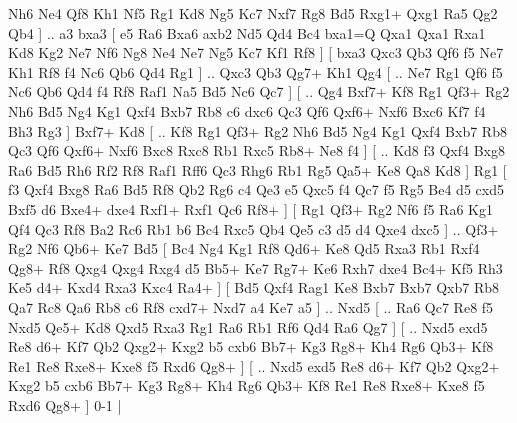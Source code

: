 Nh6  Ne4 Qf8  Kh1 Nf5  Rg1 Kd8  Ng5 Kc7  Nxf7 Rg8  Bd5 Rxg1+  Qxg1 Ra5  Qg2 Qb4   ] .. a3    bxa3 [  e5 Ra6  Bxa6 axb2  Nd5 Qd4  Bc4 bxa1=Q  Qxa1 Qxa1  Rxa1 Kd8  Kg2 Ne7  Nf6 Ng8  Ne4 Ne7  Ng5 Kc7  Kf1 Rf8   ]  [  bxa3 Qxc3  Qb3 Qf6  f5 Ne7  Kh1 Rf8  f4 Nc6  Qb6 Qd4  Rg1   ] .. Qxc3    Qb3   Qg7+    Kh1  Qg4 [ .. Ne7  Rg1 Qf6  f5 Nc6  Qb6 Qd4  f4 Rf8  Raf1 Na5  Bd5 Nc6  Qc7   ]  [ .. Qg4  Bxf7+ Kf8  Rg1 Qf3+  Rg2 Nh6  Bd5 Ng4  Kg1 Qxf4  Bxb7 Rb8  c6 dxc6  Qc3 Qf6  Qxf6+ Nxf6  Bxc6 Kf7  f4 Bh3  Rg3   ]  Bxf7+   Kd8 [ .. Kf8  Rg1 Qf3+  Rg2 Nh6  Bd5 Ng4  Kg1 Qxf4  Bxb7 Rb8  Qc3 Qf6  Qxf6+ Nxf6  Bxc8 Rxc8  Rb1 Rxc5  Rb8+ Ne8  f4   ]  [ .. Kd8  f3 Qxf4  Bxg8 Ra6  Bd5 Rh6  Rf2 Rf8  Raf1 Rff6  Qc3 Rhg6  Rb1 Rg5  Qa5+ Ke8  Qa8 Kd8   ]  Rg1 [  f3 Qxf4  Bxg8 Ra6  Bd5 Rf8  Qb2 Rg6  c4 Qe3  e5 Qxc5  f4 Qc7  f5 Rg5  Be4 d5  cxd5 Bxf5  d6 Bxe4+  dxe4 Rxf1+  Rxf1 Qc6  Rf8+   ]  [  Rg1 Qf3+  Rg2 Nf6  f5 Ra6  Kg1 Qf4  Qc3 Rf8  Ba2 Rc6  Rb1 b6  Bc4 Rxc5  Qb4 Qe5  c3 d5  d4 Qxe4  dxc5   ] .. Qf3+    Rg2  Nf6    Qb6+   Ke7   Bd5 [  Bc4 Ng4  Kg1 Rf8  Qd6+ Ke8  Qd5 Rxa3  Rb1 Rxf4  Qg8+ Rf8  Qxg4 Qxg4  Rxg4 d5  Bb5+ Ke7  Rg7+ Ke6  Rxh7 dxe4  Bc4+ Kf5  Rh3 Ke5  d4+ Kxd4  Rxa3 Kxc4  Ra4+   ]  [  Bd5 Qxf4  Rag1 Ke8  Bxb7 Bxb7  Qxb7 Rb8  Qa7 Rc8  Qa6 Rb8  c6 Rf8  cxd7+ Nxd7  a4 Ke7  a5   ] .. Nxd5 [ .. Ra6  Qc7 Re8  f5 Nxd5  Qe5+ Kd8  Qxd5 Rxa3  Rg1 Ra6  Rb1 Rf6  Qd4 Ra6  Qg7   ]  [ .. Nxd5  exd5 Re8  d6+ Kf7  Qb2 Qxg2+  Kxg2 b5  cxb6 Bb7+  Kg3 Rg8+  Kh4 Rg6  Qb3+ Kf8  Re1 Re8  Rxe8+ Kxe8  f5 Rxd6  Qg8+   ]  [ .. Nxd5  exd5 Re8  d6+ Kf7  Qb2 Qxg2+  Kxg2 b5  cxb6 Bb7+  Kg3 Rg8+  Kh4 Rg6  Qb3+ Kf8  Re1 Re8  Rxe8+ Kxe8  f5 Rxd6  Qg8+   ] 0-1  |
